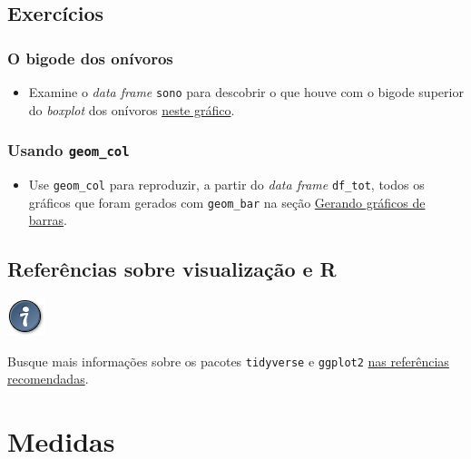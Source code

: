 \documentclass[
  11pt]{report}
\providecommand{\tightlist}{%
  \setlength{\itemsep}{0pt}\setlength{\parskip}{0pt}}
\newenvironment{rmdtip}
{
  \begin{mytip}
    \includegraphics{images/tip.png}
    \tcblower
  }
  {
  \end{mytip}
}
\begin{document}
\hypertarget{exercuxedcios-4}{%
\section{Exercícios}\label{exercuxedcios-4}}

\hypertarget{o-bigode-dos-onuxedvoros}{%
\subsection{O bigode dos onívoros}\label{o-bigode-dos-onuxedvoros}}

\begin{itemize}
\tightlist
\item
  Examine o \emph{data frame} \texttt{sono} para descobrir o que houve com o bigode superior do \emph{boxplot} dos onívoros \protect\hyperlink{onivoros}{neste gráfico}.
\end{itemize}

\hypertarget{usando-geom_col}{%
\subsection{\texorpdfstring{Usando \texttt{geom\_col}}{Usando geom\_col}}\label{usando-geom_col}}

\begin{itemize}
\tightlist
\item
  Use \texttt{geom\_col} para reproduzir, a partir do \emph{data frame} \texttt{df\_tot}, todos os gráficos que foram gerados com \texttt{geom\_bar} na seção \protect\hyperlink{gerando-grux5cux25C3ux5cux25A1ficos-de-barras}{Gerando gráficos de barras}.
\end{itemize}

\hypertarget{section}{%
\subsection{}\label{section}}

\hypertarget{referuxeancias-sobre-visualizauxe7uxe3o-e-r}{%
\section{Referências sobre visualização e R}\label{referuxeancias-sobre-visualizauxe7uxe3o-e-r}}

\begin{rmdtip}
Busque mais informações sobre os pacotes \texttt{tidyverse} e \texttt{ggplot2} \protect\hyperlink{refrec}{nas referências recomendadas}.

\end{rmdtip}

\hypertarget{medidas}{%
\chapter{Medidas}\label{medidas}}
\end{document}
